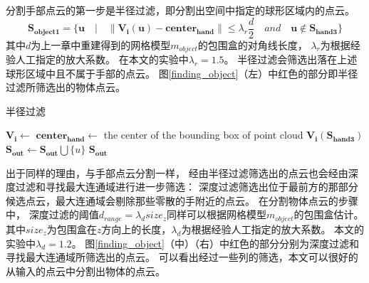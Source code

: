 分割手部点云的第一步是半径过滤，即分割出空间中指定的球形区域内的点云。
\begin{equation}
    \bm{S_{object1}} =
    \{
        \bm{u} \quad
    |   \quad
        \|\bm{V_i}(\bm{u}) - \bm{center_{hand}}\| \leqslant {\lambda}_{r}\frac{d}{2}
        \quad and \quad
        \bm{u}\notin \bm{S_{hand3}}
    \}
\end{equation}
其中$d$为上一章中重建得到的网格模型$m_{object}$的包围盒的对角线长度，
${\lambda}_r$为根据经验人工指定的放大系数。
在本文的实验中${\lambda}_r=1.5$。
半径过滤会筛选出落在上述球形区域中且不属于手部的点云。
图\ref{finding_object}（左）中红色的部分即半径过滤所筛选出的物体点云。
\begin{algorithm}
    \caption{半径过滤}
    \label{alg_rfilter}
    \begin{algorithmic}[1]
            \State $\bm{V_i} \gets$ 
            \State $\bm{center_{hand}} \gets$ the center of the bounding box of point cloud $\bm{V_i}(\bm{S_{hand3}})$
                    \State $\bm{S_{out}} \gets \bm{S_{out}} \bigcup \{u\}$
                \EndIf
            \EndFor
            \State \Return $\bm{S_{out}}$
        \EndFunction
    \end{algorithmic}
\end{algorithm} 

出于同样的理由，与手部点云分割一样，
经由半径过滤筛选出的点云也会经由深度过滤和寻找最大连通域进行进一步筛选：
深度过滤筛选出位于最前方的那部分候选点云，最大连通域会剔除那些零散的手附近的点云。
在分割物体点云的步骤中，
深度过滤的阈值$d_{range} = {\lambda}_{d} size_z$同样可以根据网格模型$m_{object}$的包围盒估计。
其中$size_z$为包围盒在$z$方向上的长度，${\lambda}_d$为根据经验人工指定的放大系数。
本文的实验中${\lambda}_d = 1.2$。
图\ref{finding_object}（中）（右）中红色的部分分别为深度过滤和寻找最大连通域所筛选出的点云。
可以看出经过一些列的筛选，本文可以很好的从输入的点云中分割出物体的点云。

